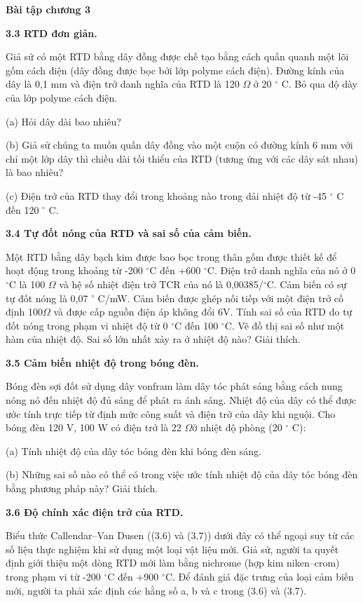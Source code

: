 \documentclass[12pt]{article}
\newcommand{\bt}[1]{\textbf{#1}}
\begin{document}
\clearpage
\begin{center}
{\Large\bfseries Bài tập chương 3}
\end{center}

\bt{3.3 RTD đơn giản.}

Giả sử có một RTD bằng dây đồng được chế tạo bằng cách quấn quanh một lõi gốm cách điện (dây đồng được bọc bởi lớp polyme cách điện). Đường kính của dây là 0,1 mm và điện trở danh nghĩa của RTD là 120 $\Omega$ ở 20 $^\circ$ C. Bỏ qua độ dày của lớp polyme cách điện.

(a) Hỏi dây dài bao nhiêu?

(b) Giả sử chúng ta muốn quấn dây đồng vào một cuộn có đường kính 6 mm với chỉ một lớp dây thì chiều dài tối thiểu của RTD (tương ứng với các dây sát nhau) là bao nhiêu?

(c) Điện trở của RTD thay đổi trong khoảng nào trong dải nhiệt độ từ -45 $^\circ$ C đến 120 $^\circ$ C.

\bt{3.4 Tự đốt nóng của RTD và sai số của cảm biến.}

Một RTD bằng dây bạch kim được bao bọc trong thân gốm được thiết kế để hoạt động trong khoảng từ -200 $^\circ$C đến +600 $^\circ$C. Điện trở danh nghĩa của nó ở 0 $^\circ$C là 100 $\Omega$ và hệ số nhiệt điện trở TCR của nó là 0,00385/$^\circ$C. Cảm biến có sự tự đốt nóng là 0,07 $^\circ$ C/mW. Cảm biến được ghép nối tiếp với một điện trở cố định 100$\Omega$ và được cấp nguồn điện áp không đổi 6V. Tính sai số của RTD do tự đốt nóng trong phạm vi nhiệt độ từ 0 $^\circ$C đến 100 $^\circ$C. Vẽ đồ thị sai số như một hàm của nhiệt độ. Sai số lớn nhất xảy ra ở nhiệt độ nào? Giải thích.

\bt{3.5 Cảm biến nhiệt độ trong bóng đèn.}

Bóng đèn sợi đốt sử dụng dây vonfram làm dây tóc phát sáng bằng cách nung nóng nó đến nhiệt độ đủ sáng để phát ra ánh sáng. Nhiệt độ của dây có thể được ước tính trực tiếp từ định mức công suất và điện trở của dây khi nguội. Cho bóng đèn 120 V, 100 W có điện trở là 22 $\Omega$ở nhiệt độ phòng (20 $^\circ$ C):

(a) Tính nhiệt độ của dây tóc bóng đèn khi bóng đèn sáng.

(b) Những sai số nào có thể có trong việc ước tính nhiệt độ của dây tóc bóng đèn bằng phương pháp này? Giải thích.

\bt{3.6 Độ chính xác điện trở của RTD.}

Biểu thức Callendar–Van Dusen ((3.6) và (3.7)) dưới đây có thể ngoại suy từ các số liệu thực nghiệm khi sử dụng một loại vật liệu mới. Giả sử, người ta quyết định giới thiệu một dòng RTD mới làm bằng nichrome (hợp kim niken–crom) trong phạm vi từ -200 $^\circ$C đến +900 $^\circ$C. Để đánh giá đặc trưng của loại cảm biến mới, người ta phải xác định các hằng số a, b và c trong (3.6) và (3.7).
\end{document}
